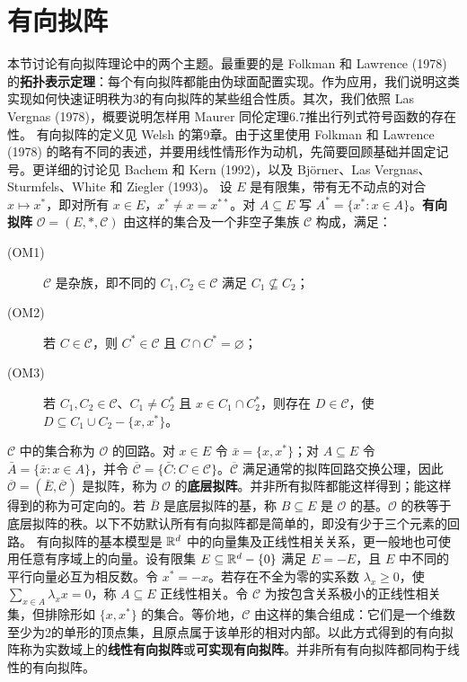 \section{有向拟阵}
本节讨论有向拟阵理论中的两个主题。最重要的是 Folkman 和 Lawrence (1978) 的\textbf{拓扑表示定理}：每个有向拟阵都能由伪球面配置实现。作为应用，我们说明这类实现如何快速证明秩为3的有向拟阵的某些组合性质。其次，我们依照 Las Vergnas (1978)，概要说明怎样用 Maurer 同伦定理6.7推出行列式符号函数的存在性。
有向拟阵的定义见 Welsh 的第9章。由于这里使用 Folkman 和 Lawrence (1978) 的略有不同的表述，并要用线性情形作为动机，先简要回顾基础并固定记号。更详细的讨论见 Bachem 和 Kern (1992)，以及 Björner、Las Vergnas、Sturmfels、White 和 Ziegler (1993)。
设 $E$ 是有限集，带有无不动点的对合 $x\mapsto x^*$，即对所有 $x\in E$，$x^*\ne x=x^{**}$。对 $A\subseteq E$ 写 $A^*=\{x^*:x\in A\}$。\textbf{有向拟阵} $\mathcal O=(E,*,\mathcal C)$ 由这样的集合及一个非空子集族 $\mathcal C$ 构成，满足：
\begin{description}
\item[(OM1)] $\mathcal C$ 是杂族，即不同的 $C_1,C_2\in\mathcal C$ 满足 $C_1\nsubseteq C_2$；
\item[(OM2)] 若 $C\in\mathcal C$，则 $C^*\in\mathcal C$ 且 $C\cap C^*=\varnothing$；
\item[(OM3)] 若 $C_1,C_2\in\mathcal C$、$C_1\ne C_2^*$ 且 $x\in C_1\cap C_2^*$，则存在 $D\in\mathcal C$，使 $D\subseteq C_1\cup C_2-\{x,x^*\}$。
\end{description}
$\mathcal C$ 中的集合称为 $\mathcal O$ 的回路。对 $x\in E$ 令 $\bar x=\{x,x^*\}$；对 $A\subseteq E$ 令 $\bar A=\{\bar x:x\in A\}$，并令 $\overline{\mathcal C}=\{\bar C:C\in\mathcal C\}$。$\overline{\mathcal C}$ 满足通常的拟阵回路交换公理，因此 $\overline{\mathcal O}=(\bar E,\overline{\mathcal C})$ 是拟阵，称为 $\mathcal O$ 的\textbf{底层拟阵}。并非所有拟阵都能这样得到；能这样得到的称为可定向的。若 $\bar B$ 是底层拟阵的基，称 $B\subseteq E$ 是 $\mathcal O$ 的基。$\mathcal O$ 的秩等于底层拟阵的秩。以下不妨默认所有有向拟阵都是简单的，即没有少于三个元素的回路。
有向拟阵的基本模型是 $\mathbb R^d$ 中的向量集及正线性相关关系，更一般地也可使用任意有序域上的向量。设有限集 $E\subseteq\mathbb R^d-\{0\}$ 满足 $E=-E$，且 $E$ 中不同的平行向量必互为相反数。令 $x^*=-x$。若存在不全为零的实系数 $\lambda_x\ge0$，使 $\sum_{x\in A}\lambda_xx=0$，称 $A\subseteq E$ 正线性相关。令 $\mathcal C$ 为按包含关系极小的正线性相关集，但排除形如 $\{x,x^*\}$ 的集合。等价地，$\mathcal C$ 由这样的集合组成：它们是一个维数至少为2的单形的顶点集，且原点属于该单形的相对内部。以此方式得到的有向拟阵称为实数域上的\textbf{线性有向拟阵}或\textbf{可实现有向拟阵}。并非所有有向拟阵都同构于线性的有向拟阵。
